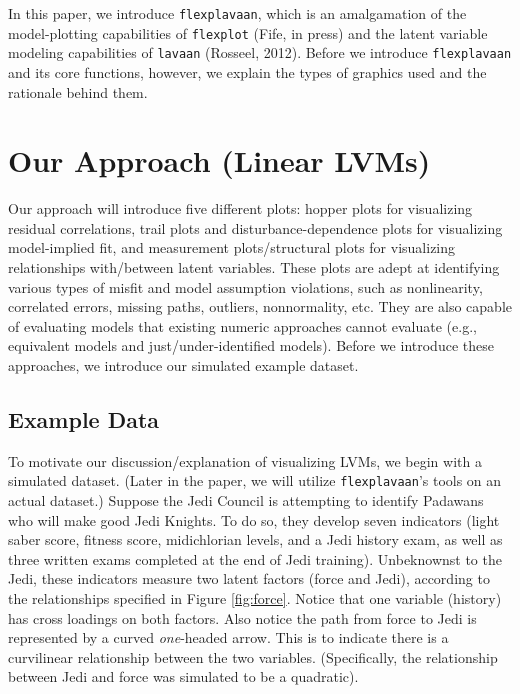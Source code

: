 \documentclass[
  english,
  man]{apa6}
\begin{document}
In this paper, we introduce \texttt{flexplavaan}, which is an amalgamation of the model-plotting capabilities of \texttt{flexplot} (Fife, in press) and the latent variable modeling capabilities of \texttt{lavaan} (Rosseel, 2012). Before we introduce \texttt{flexplavaan} and its core functions, however, we explain the types of graphics used and the rationale behind them.

\hypertarget{our-approach-linear-lvms}{%
\section{Our Approach (Linear LVMs)}\label{our-approach-linear-lvms}}

Our approach will introduce five different plots: hopper plots for visualizing residual correlations, trail plots and disturbance-dependence plots for visualizing model-implied fit, and measurement plots/structural plots for visualizing relationships with/between latent variables. These plots are adept at identifying various types of misfit and model assumption violations, such as nonlinearity, correlated errors, missing paths, outliers, nonnormality, etc. They are also capable of evaluating models that existing numeric approaches cannot evaluate (e.g., equivalent models and just/under-identified models). Before we introduce these approaches, we introduce our simulated example dataset.

\hypertarget{example-data}{%
\subsection{Example Data}\label{example-data}}

To motivate our discussion/explanation of visualizing LVMs, we begin with a simulated dataset. (Later in the paper, we will utilize \texttt{flexplavaan}'s tools on an actual dataset.) Suppose the Jedi Council is attempting to identify Padawans who will make good Jedi Knights. To do so, they develop seven indicators (light saber score, fitness score, midichlorian levels, and a Jedi history exam, as well as three written exams completed at the end of Jedi training). Unbeknownst to the Jedi, these indicators measure two latent factors (force and Jedi), according to the relationships specified in Figure \ref{fig:force}. Notice that one variable (history) has cross loadings on both factors. Also notice the path from force to Jedi is represented by a curved \emph{one}-headed arrow. This is to indicate there is a curvilinear relationship between the two variables. (Specifically, the relationship between Jedi and force was simulated to be a quadratic).
\end{document}
